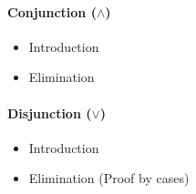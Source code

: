 \paragraph{Conjunction ($\land$)}
\begin{itemize}
  \item Introduction
        \begin{prooftree}
        \end{prooftree}
  \item Elimination
        \noindent
        \begin{minipage}[t]{0.5\textwidth}
          \begin{prooftree}
          \end{prooftree}
        \end{minipage}\hfill
        \begin{minipage}[t]{0.5\textwidth}
          \begin{prooftree}
          \end{prooftree}
        \end{minipage}
\end{itemize}
\paragraph{Disjunction ($\lor$)}
\begin{itemize}
  \item Introduction
        \begin{minipage}[t]{0.5\textwidth}
          \begin{prooftree}
          \end{prooftree}
        \end{minipage}\hfill
        \begin{minipage}[t]{0.5\textwidth}
          \begin{prooftree}
          \end{prooftree}
        \end{minipage}
  \item Elimination (Proof by cases)
        \begin{prooftree}
        \end{prooftree}
\end{itemize}
